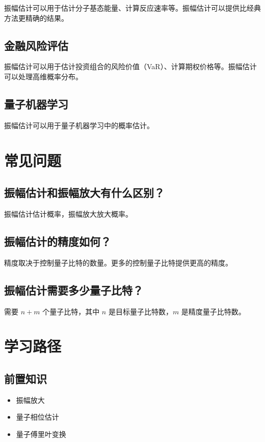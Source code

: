 \documentclass[12pt,a4paper]{article}
\begin{document}
振幅估计可以用于估计分子基态能量、计算反应速率等。振幅估计可以提供比经典方法更精确的结果。

\subsection{金融风险评估}

振幅估计可以用于估计投资组合的风险价值（VaR）、计算期权价格等。振幅估计可以处理高维概率分布。

\subsection{量子机器学习}

振幅估计可以用于量子机器学习中的概率估计。

\section{常见问题}

\subsection{振幅估计和振幅放大有什么区别？}

振幅估计估计概率，振幅放大放大概率。

\subsection{振幅估计的精度如何？}

精度取决于控制量子比特的数量。更多的控制量子比特提供更高的精度。

\subsection{振幅估计需要多少量子比特？}

需要 $n + m$ 个量子比特，其中 $n$ 是目标量子比特数，$m$ 是精度量子比特数。

\section{学习路径}

\subsection{前置知识}
\begin{itemize}
  \item 振幅放大
  \item 量子相位估计
  \item 量子傅里叶变换
\end{itemize}
\end{document}
